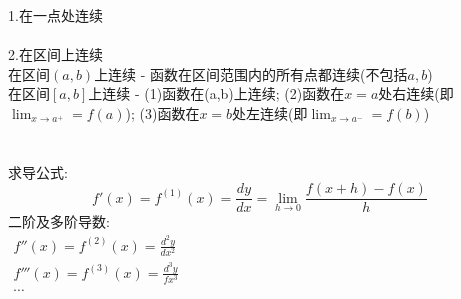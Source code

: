 \documentclass[UFT8, fontset=ubuntu]{ctexart}
\begin{document}
1.在一点处连续\\[1ex]
\\[4ex]
2.在区间上连续\\
在区间$(a,b)$上连续 - 函数在区间范围内的所有点都连续(不包括$a,b$)\\
在区间$[a,b]$上连续 - (1)函数在(a,b)上连续; (2)函数在$x=a$处右连续(即$\displaystyle\lim_{x\to a^+}=f(a)$); (3)函数在$x=b$处左连续(即$\displaystyle\lim_{x\to a^-}=f(b)$)\\[4ex]
\\[4ex]
\\[4ex]
求导公式:
\[f'(x)=f^{(1)}(x)=\frac{dy}{dx}=\lim_{h\to 0}\frac{f(x+h)-f(x)}{h}\]
二阶及多阶导数:\\
\begin{math}
\begin{array}{l}
	\displaystyle f''(x)=f^{(2)}(x)=\frac{d^2y}{dx^2}\\[2ex]
	\displaystyle f'''(x)=f^{(3)}(x)=\frac{d^3y}{fx^3}\\[2ex]
	\cdots
\end{array}
\end{math}\\[2ex]
\end{document}
